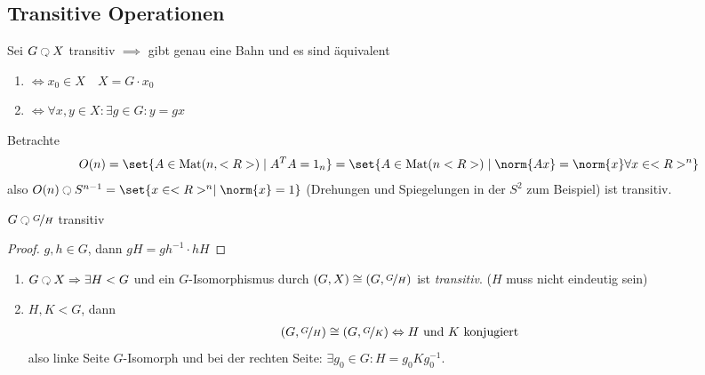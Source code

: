 \subsection*{Transitive Operationen}
\begin{definition}
	Sei $G \Circlearrowleft X$ transitiv $\implies$ gibt genau eine Bahn und es sind äquivalent
	\begin{enumerate}
		\item $\Leftrightarrow x_0 \in X\quad X = G \cdot x_0$
		\item $\Leftrightarrow \forall x,y \in X\colon \exists g \in G \colon y = gx$ 
	\end{enumerate}
\end{definition}
\begin{*example}
	Betrachte 
	\begin{align*}
		O(n) = \set{A \in \Mat(n,\R) \mid A^T A = 1_n} = \set{A \in \Mat(n\R)\mid \norm{Ax} = \norm{x} \forall x \in \R^n}
	\end{align*}
	also $O(n) \Circlearrowleft S^{n-1} = \set{x \in \R^n \mid \norm{x} = 1}$ (Drehungen und Spiegelungen in der $S^2$ zum Beispiel) ist transitiv.
\end{*example}
\begin{lemma}
	$G \Circlearrowleft \lnkset{G}{H}$ transitiv
\end{lemma}
\begin{proof}
	$g,h \in G$, dann $gH = gh^{-1}\cdot h H$
\end{proof}
\begin{theorem}
	\begin{enumerate}
		\item $G \Circlearrowleft X \implies \exists H < G$ und ein $G$-Isomorphismus durch $(G,X) \cong (G, \lnkset{G}{H})$ ist \emph{transitiv}. ($H$ muss nicht eindeutig sein)
		\item $H,K < G$, dann
		\begin{align*}
			(G, \lnkset{G}{H}) \cong (G, \lnkset{G}{K}) \Leftrightarrow H \und K \text{ konjugiert} 
		\end{align*}
		also linke Seite $G$-Isomorph und bei der rechten Seite: $\exists g_0 \in G\colon H = g_0 Kg_0^{-1}$.
	\end{enumerate}
\end{theorem}
